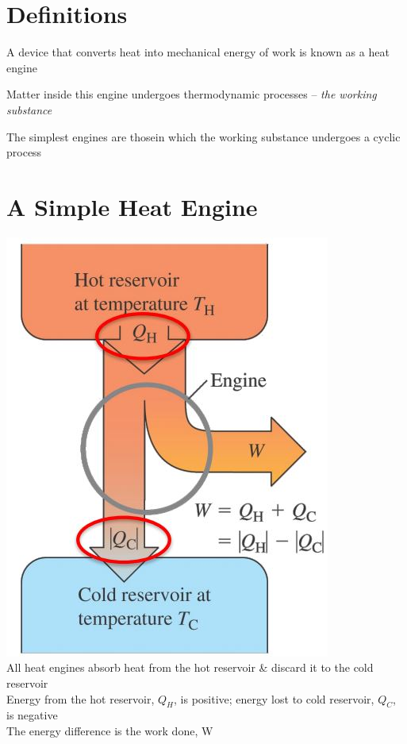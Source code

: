 \documentclass[a4paper, 11pt, fleqn, normalem]{report}
\begin{document}
\section{Definitions}
A device that converts heat into mechanical energy of work is known as a heat engine

Matter inside this engine undergoes thermodynamic processes -- \emph{the working substance}

The simplest engines are thosein which the working substance undergoes a cyclic process

\section{A Simple Heat Engine}
\includegraphics[scale=0.7]{HeatEngine.jpg} \\
All heat engines absorb heat from the hot reservoir \& discard it to the cold reservoir \\
Energy from the hot reservoir, $Q_{H}$, is positive; energy lost to cold reservoir, $Q_{C}$, is negative \\
The energy difference is the work done, W
\end{document}
